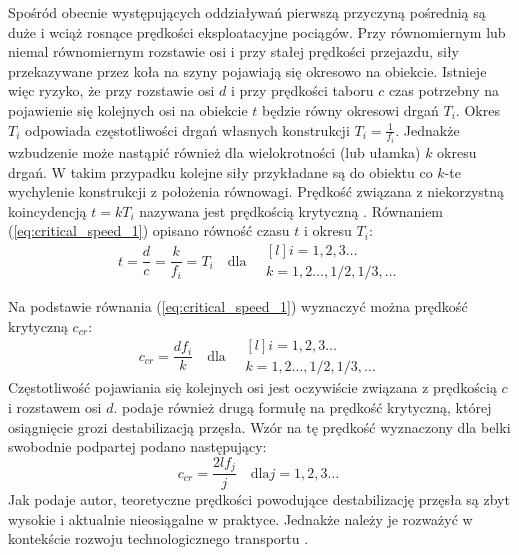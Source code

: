 Spośród obecnie występujących oddziaływań pierwszą przyczyną pośrednią są duże i wciąż rosnące prędkości eksploatacyjne pociągów. Przy równomiernym lub niemal równomiernym rozstawie osi i przy stałej prędkości przejazdu, siły przekazywane przez koła na szyny pojawiają się okresowo na obiekcie. Istnieje więc ryzyko, że przy rozstawie osi $d$ i przy prędkości taboru $c$ czas potrzebny na pojawienie się kolejnych osi na obiekcie $t$ będzie równy okresowi drgań $T_i$. Okres $T_i$ odpowiada częstotliwości drgań własnych konstrukcji $T_i=\frac{1}{f_i}$. Jednakże wzbudzenie może nastąpić również dla wielokrotności (lub ułamka) $k$ okresu drgań. W takim przypadku kolejne siły przykładane są do obiektu co $k$-te wychylenie konstrukcji z położenia równowagi. Prędkość związana z niekorzystną koincydencją $t=kT_i$ nazywana jest prędkością krytyczną . Równaniem (\ref{eq:critical_speed_1}) opisano równość czasu $t$ i okresu $T_i$:
\begin{equation} \label{eq:critical_speed_1}
	t=\frac{d}{c}=\frac{k}{f_i}=T_i \quad\text{dla}\quad
	\begin{matrix*}[l]
		i=1,2,3\dots\ \\
		k=1,2\dots,1/2,1/3,\dots
	\end{matrix*}
\end{equation}

Na podstawie równania (\ref{eq:critical_speed_1}) wyznaczyć można prędkość krytyczną $c_{cr}$:
\begin{equation} \label{eq:critical_speed_2}
	c_{cr}=\frac{df_i}{k}\quad \text{dla}\quad
	\begin{matrix*}[l]
		i=1,2,3\dots\ \\
		k=1,2\dots,1/2,1/3,\dots
	\end{matrix*}
\end{equation}
Częstotliwość pojawiania się kolejnych osi jest oczywiście związana z prędkością $c$ i rozstawem osi $d$. \cite{Fryba2001} podaje również drugą formułę na prędkość krytyczną, której osiągnięcie grozi destabilizacją przęsła. Wzór na tę prędkość wyznaczony dla belki swobodnie podpartej podano następujący:
\begin{equation} \label{eq:criticla_speed}
	c_{cr}=\frac{2lf_j}{j}\quad\text{dla}j=1,2,3\dots\ 
\end{equation}
Jak podaje autor, teoretyczne prędkości powodujące destabilizację przęsła są zbyt wysokie i aktualnie nieosiągalne w praktyce. Jednakże należy je rozważyć w kontekście rozwoju technologicznego transportu \parencite{Ladislav2008}.

